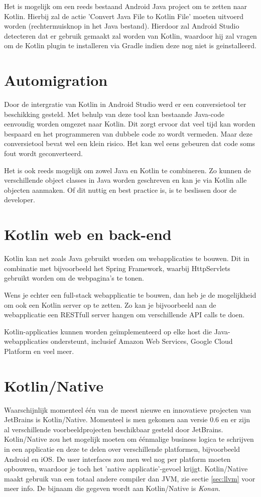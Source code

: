 Het is mogelijk om een reeds bestaand Android Java project om te zetten naar Kotlin. Hierbij zal de actie 'Convert Java File to Kotlin File' moeten uitvoerd worden (rechtermuisknop in het Java bestand). Hierdoor zal Android Studio detecteren dat er gebruik gemaakt zal worden van Kotlin, waardoor hij zal vragen om de Kotlin plugin te installeren via Gradle indien deze nog niet is geinstalleerd.

\section{Automigration}
\label{sec:Automigration}
Door de intergratie van Kotlin in Android Studio werd er een conversietool ter beschikking gesteld. Met behulp van deze tool kan bestaande Java-code eenvoudig worden omgezet naar Kotlin. Dit zorgt ervoor dat veel tijd kan worden bespaard en het programmeren van dubbele code zo wordt vermeden. Maar deze conversietool bevat wel een klein risico. Het kan wel eens gebeuren dat code soms fout wordt geconverteerd. 

Het is ook reeds mogelijk om zowel Java en Kotlin te combineren. Zo kunnen de verschillende object classes in Java worden geschreven en kan je via Kotlin alle objecten aanmaken. Of dit nuttig en best practice is, is te beslissen door de developer.

\section{Kotlin web en back-end}
\label{sec:kotlincrossplatform}
Kotlin kan net zoals Java gebruikt worden om webapplicaties te bouwen. Dit in combinatie met bijvoorbeeld het Spring Framework, waarbij HttpServlets gebruikt worden om de webpagina's te tonen.

Wens je echter een full-stack webapplicatie te bouwen, dan heb je de mogelijkheid om ook een Kotlin server op te zetten. Zo kan je bijvoorbeeld aan de webapplicatie een RESTfull server hangen om verschillende API calls te doen.

Kotlin-applicaties kunnen worden geïmplementeerd op elke host die Java-webapplicaties ondersteunt, inclusief Amazon Web Services, Google Cloud Platform en veel meer.

\section{Kotlin/Native}
\label{sec:kotlinnative}
Waarschijnlijk momenteel één van de meest nieuwe en innovatieve projecten van JetBrains is Kotlin/Native. Momenteel is men gekomen aan versie 0.6 en er zijn al verschillende voorbeeldprojecten beschikbaar gesteld door JetBrains. Kotlin/Native zou het mogelijk moeten om éénmalige business logica te schrijven in een applicatie en deze te delen over verschillende platformen, bijvoorbeeld Android en iOS. De user interfaces zou men wel nog per platform moeten opbouwen, waardoor je toch het 'native applicatie'-gevoel krijgt. Kotlin/Native maakt gebruik van een totaal andere compiler dan JVM, zie sectie \ref{sec:llvm} voor meer info. De bijnaam die gegeven wordt aan Kotlin/Native is \textit{Konan}.

